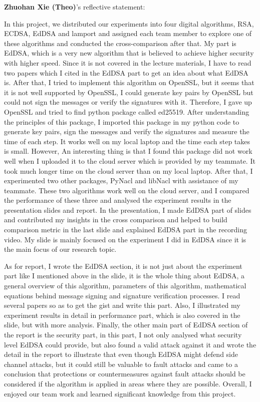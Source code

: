 \documentclass[10pt,sigconf]{acmart}
\begin{document}
\vspace{1em}

\noindent \textbf{Zhuohan Xie (Theo)}'s reflective statement:

In this project, we distributed our experiments into four digital algorithms, RSA, ECDSA, EdDSA and lamport and assigned each team member to explore one of these algorithms and conducted the cross-comparison after that. 
My part is EdDSA, which is a very new algorithm that is believed to achieve higher security with higher speed. Since it is not covered in the lecture materials, I have to read two papers which I cited in the EdDSA part to get an idea about what EdDSA is.
After that, I tried to implement this algorithm on OpenSSL, but it seems that it is not well supported by OpenSSL, I could generate key pairs by OpenSSL but could not sign the messages or verify the signatures with it. Therefore, I gave up OpenSSL and tried to find python package called ed25519.
After understanding the principles of this package, I imported this package in my python code to generate key pairs, sign the messages and verify the signatures and measure the time of each step. It works well on my local laptop and the time each step takes is small. However, An interesting thing is that I found this package did not work well when I uploaded it to the cloud server which is provided by my teammate. It took much longer time on the cloud server than on my local laptop. After that, I experimented two other packages, PyNacl and libNacl with assistance of my teammate. These two algorithms work well on the cloud server, and I compared the performance of these three and analysed the experiment results in the presentation slides and report. 
In the presentation, I made EdDSA part of slides and contributed my insights in the cross comparison and helped to build comparison metric in the last slide and explained EdDSA part in the recording video. My slide is mainly focused on the experiment I did in EdDSA since it is the main focus of our research topic.

As for report, I wrote the EdDSA section, it is not just about the experiment part like I mentioned above in the slide, it is the whole thing about EdDSA, a general overview of this algorithm, parameters of this algorithm, mathematical equations behind message signing and signature verification processes. I read several papers so as to get the gist and write this part. Also, I illustrated my experiment results in detail in performance part, which is also covered in the slide, but with more analysis. 
Finally, the other main part of EdDSA section of the report is the security part, in this part, I not only analysed what security level EdDSA could provide, but also found a valid attack against it and wrote the detail in the report to illustrate that even though EdDSA might defend side channel attacks, but it could still be valuable to fault attacks and came to a conclusion that protections or countermeasures against fault attacks should be considered if the algorithm is applied in areas where they are possible.
Overall, I enjoyed our team work and learned significant knowledge from this project.
\end{document}
